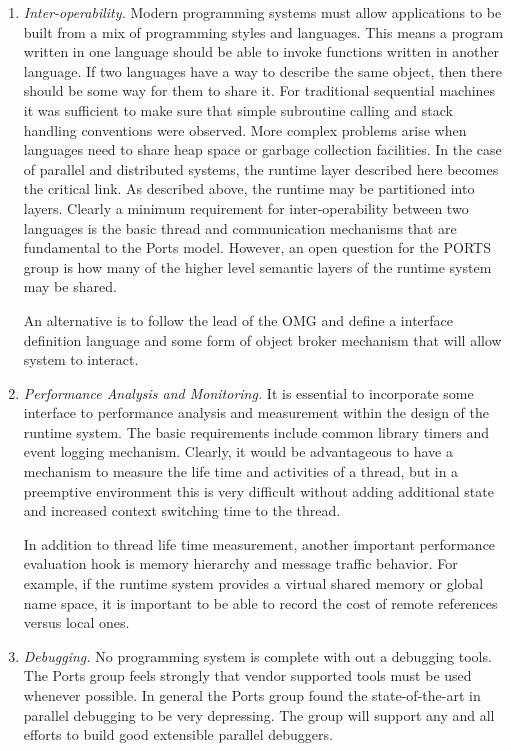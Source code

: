 \begin{enumerate}
\item
{\em Inter-operability.}  Modern programming systems must allow
applications to be built from a mix of programming styles and languages.
This means a program written in one language should be able to invoke 
functions written in another language.  If two languages have a 
way to describe the same object, then there should be some way for
them to share it. 
For traditional sequential machines it was sufficient to make sure
that simple subroutine calling and stack handling conventions were
observed. More complex problems arise when languages need to share
heap space or garbage collection facilities.  In the case of parallel
and distributed systems, the runtime layer described here becomes
the critical link.  As described above, the runtime may be partitioned
into layers.  Clearly a minimum requirement for inter-operability
between two languages is the basic thread and communication mechanisms
that are fundamental to the Ports model.  However, an open
question for the PORTS group is how many of the higher level semantic
layers of the runtime system may be shared.

An alternative is to follow the lead of the OMG and define a interface
definition language and some form of object broker mechanism that
will allow system to interact.

\item
{\em Performance Analysis and Monitoring.}
It is essential to incorporate some interface to performance analysis
and measurement within the design of the runtime system.  The
basic requirements include common library timers and event logging
mechanism.  Clearly, it would be advantageous to have a mechanism
to measure the life time and activities of a thread, but in a preemptive
environment this is very difficult without adding  additional
state and increased context switching time to the thread.

In addition to thread life time measurement, another important
performance evaluation hook is memory hierarchy and message
traffic behavior.  For example, if the runtime system provides
a virtual shared memory or global name space, it is important to
be able to record the cost of remote references versus local
ones.


\item
{\em Debugging.} No programming system is complete with out
a debugging tools.  The Ports group feels strongly that vendor
supported tools must be used whenever possible.  In general
the Ports group found the state-of-the-art in parallel debugging
to be very depressing.  The group will support any and all
efforts to build good extensible parallel debuggers.


\end{enumerate}
